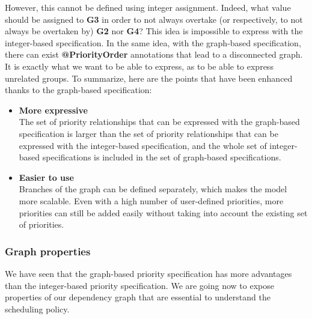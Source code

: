 \documentclass[11pt]{report}
\begin{document}
However, this cannot be defined using integer assignment. Indeed, what value should be assigned to \textbf{G3} in order to not always overtake (or respectively, to not always be overtaken by) \textbf{G2} nor \textbf{G4}? This idea is impossible to express with the integer-based specification.
In the same idea, with the graph-based specification, there can exist \textbf{@PriorityOrder} annotations that lead to a disconnected graph. It is exactly what we want to be able to express, as to be able to express unrelated groups. To summarize, here are the points that have been enhanced thanks to the graph-based specification: 

\begin{itemize}
\item \textbf{More expressive}\\ The set of priority relationships that can be expressed with the graph-based specification is larger than the set of priority relationships that can be expressed with the integer-based specification, and the whole set of integer-based specifications is included in the set of graph-based specifications.
\item \textbf{Easier to use}\\ Branches of the graph can be defined separately, which makes the model more scalable. Even with a high number of user-defined priorities, more priorities can still be added easily without taking into account the existing set of priorities.
\end{itemize}

\subsubsection{Graph properties}
We have seen that the graph-based priority specification has more advantages than the integer-based priority specification. We are going now to expose properties of our dependency graph that are essential to understand the scheduling policy.\\
\end{document}
